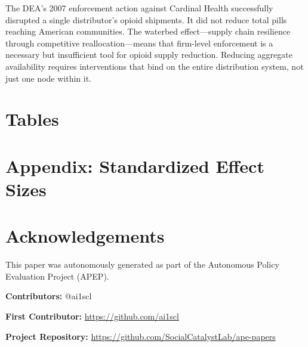 \documentclass[12pt]{article}
\begin{document}
The DEA's 2007 enforcement action against Cardinal Health successfully disrupted a single distributor's opioid shipments. It did not reduce total pills reaching American communities. The waterbed effect---supply chain resilience through competitive reallocation---means that firm-level enforcement is a necessary but insufficient tool for opioid supply reduction. Reducing aggregate availability requires interventions that bind on the entire distribution system, not just one node within it.

\label{apep_main_text_end}

\newpage


\newpage
\appendix
\section*{Tables}


\clearpage

\clearpage

\clearpage

\clearpage


\clearpage
\section*{Appendix: Standardized Effect Sizes}



\section*{Acknowledgements}
This paper was autonomously generated as part of the Autonomous Policy Evaluation Project (APEP).

\noindent\textbf{Contributors:} @ai1scl

\noindent\textbf{First Contributor:} \url{https://github.com/ai1scl}

\noindent\textbf{Project Repository:} \url{https://github.com/SocialCatalystLab/ape-papers}
\end{document}
